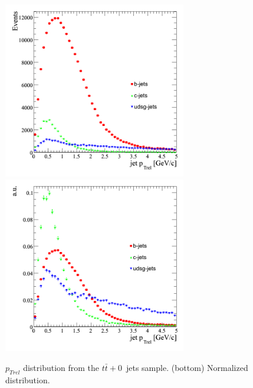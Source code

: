 \begin{figure}[htbp]
  \begin{center}
    \includegraphics[width=80mm]{Figures/jet_ptrel_tt0j.png}
    \includegraphics[width=80mm]{Figures/jet_ptrel_norm_tt0j.png}
  \end{center}
  \caption{$p_{Trel}$ distribution from the $t\bar{t}+0$~jets sample. (bottom) Normalized distribution.}
  \label{fig:jet_ptrel_all_ttbar}
\end{figure}




